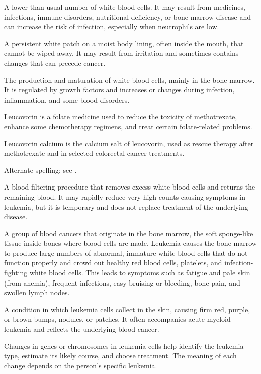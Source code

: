  A lower-than-usual number of white blood cells. It may result from medicines, infections, immune disorders, nutritional deficiency, or bone-marrow disease and can increase the risk of infection, especially when neutrophils are low.

 A persistent white patch on a moist body lining, often inside the mouth, that cannot be wiped away. It may result from irritation and sometimes contains changes that can precede cancer.

 The production and maturation of white blood cells, mainly in the bone marrow. It is regulated by growth factors and increases or changes during infection, inflammation, and some blood disorders.

 Leucovorin is a folate medicine used to reduce the toxicity of methotrexate, enhance some chemotherapy regimens, and treat certain folate-related problems.

 Leucovorin calcium is the calcium salt of leucovorin, used as rescue therapy after methotrexate and in selected colorectal-cancer treatments.

 Alternate spelling; see .

 A blood-filtering procedure that removes excess white blood cells and returns the remaining blood. It may rapidly reduce very high counts causing symptoms in leukemia, but it is temporary and does not replace treatment of the underlying disease.

 A group of blood cancers that originate in the bone marrow, the soft sponge-like tissue inside bones where blood cells are made. Leukemia causes the bone marrow to produce large numbers of abnormal, immature white blood cells that do not function properly and crowd out healthy red blood cells, platelets, and infection-fighting white blood cells. This leads to symptoms such as fatigue and pale skin (from anemia), frequent infections, easy bruising or bleeding, bone pain, and swollen lymph nodes.

 A condition in which leukemia cells collect in the skin, causing firm red, purple, or brown bumps, nodules, or patches. It often accompanies acute myeloid leukemia and reflects the underlying blood cancer.

 Changes in genes or chromosomes in leukemia cells help identify the leukemia type, estimate its likely course, and choose treatment. The meaning of each change depends on the person’s specific leukemia.

